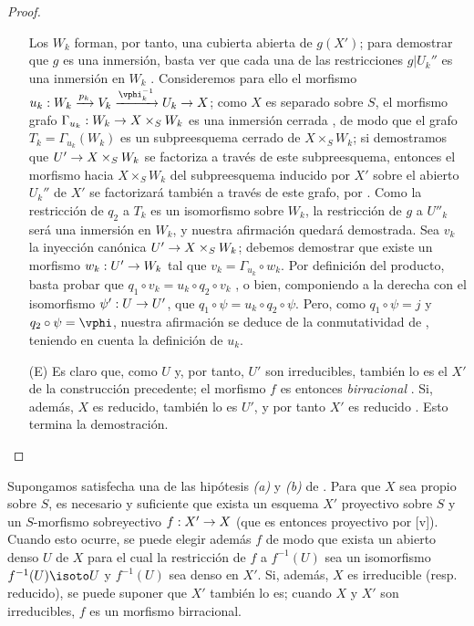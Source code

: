 \documentclass[oneside,10pt]{amsart}
\makeatletter
\newcommand{\ega@arrow}[2]{\mathchoice{#1}{#2}{#2}{#2}}
\renewcommand{\to}{\ega@arrow{\longrightarrow}{\rightarrow}}
\newcommand{\oldpage}[2][]{\marginnote{\normalfont\footnotesize\textbf{#1}~|~#2}\ignorespaces}
\let\EGAOriginalLabel\label
\renewcommand{\label}[1]{\phantomsection\EGAOriginalLabel{#1}}
\makeatother
\begin{document}
\begin{proof}
\begin{enumerate}
    Los $W_k$ forman, por tanto, una cubierta abierta de $g(X')$; para demostrar que $g$ es una inmersión, basta ver que cada una de las restricciones $g|U_k''$ es una inmersión en $W_k$ .
    Consideremos para ello el morfismo $u_k:W_k\xrightarrow{p_k}V_k\xrightarrow{\vphi_k^{-1}}U_k\to X$; como $X$ es separado sobre $S$, el morfismo grafo $\Gamma_{u_k}:W_k\to X\times_S W_k$ es una inmersión cerrada , de modo que el grafo $T_k=\Gamma_{u_k}(W_k)$ es un subpreesquema cerrado de $X\times_S W_k$;
    si demostramos que $U'\to X\times_S W_k$ se factoriza a través de este subpreesquema, entonces el morfismo hacia $X\times_S W_k$ del subpreesquema inducido por $X'$ sobre el abierto $U_k''$ de $X'$ se factorizará también a través de este grafo, por .
    Como la restricción de $q_2$ a $T_k$ es un isomorfismo sobre $W_k$, la restricción de $g$ a $U''_k$ será una inmersión en $W_k$, y nuestra afirmación quedará demostrada.
    Sea $v_k$ la inyección canónica $U'\to X\times_S W_k$; debemos demostrar que existe un morfismo $w_k:U'\to W_k$ tal que $v_k=\Gamma_{u_k}\circ w_k$.
    Por definición del producto, basta probar que $q_1\circ v_k=u_k\circ q_2\circ v_k$ , o bien, componiendo a la derecha
\oldpage[II]{109}
    con el isomorfismo $\psi':U\to U'$, que $q_1\circ\psi=u_k\circ q_2\circ\psi$.
    Pero, como $q_1\circ\psi=j$ y $q_2\circ\psi=\vphi$, nuestra afirmación se deduce de la conmutatividad de , teniendo en cuenta la definición de $u_k$.

  \item[(E)] Es claro que, como $U$ y, por tanto, $U'$ son irreducibles, también lo es el $X'$ de la construcción precedente; el morfismo $f$ es entonces \emph{birracional} .
    Si, además, $X$ es reducido, también lo es $U'$, y por tanto $X'$ es reducido .
    Esto termina la demostración.
\end{enumerate}
\end{proof}

\begin{corollary}[5.6.2]
\label{II.5.6.2}
Supongamos satisfecha una de las hipótesis \emph{(a)} y \emph{(b)} de .
Para que $X$ sea propio sobre $S$, es necesario y suficiente que exista un esquema $X'$ proyectivo sobre $S$ y un $S$-morfismo sobreyectivo $f:X'\to X$ (que es entonces proyectivo por [v]).
Cuando esto ocurre, se puede elegir además $f$ de modo que exista un abierto denso $U$ de $X$ para el cual la restricción de $f$ a $f^{-1}(U)$ sea un isomorfismo $f^{-1}(U)\isoto U$ y $f^{-1}(U)$ sea denso en $X'$.
Si, además, $X$ es irreducible \textup{(resp.} reducido), se puede suponer que $X'$ también lo es; cuando $X$ y $X'$ son irreducibles, $f$ es un morfismo birracional.
\end{corollary}
\end{document}
